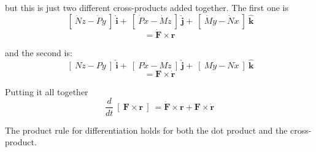 \documentclass[11pt, oneside]{article}
\begin{document}
but this is just two different cross-products added together.  The first one is
\[ \ [ \ \dot{N} z - \dot{P} y \ ] \ \mathbf{\hat{i}} + \  [ \ \dot{P} x - \dot{M} z \ ] \ \mathbf{\hat{j}} +  \ [ \ \dot{M} y - \dot{N} x \ ] \ \mathbf{\hat{k}} \]
\[ = \mathbf{\dot{F}} \times \mathbf{r} \]

and the second is:
\[ \ [ \  N \dot{z}  - P \dot{y} \ ] \ \mathbf{\hat{i}} + \  [ \ P \dot{x} - M \dot{z} \ ] \ \mathbf{\hat{j}} +  \ [ \ M \dot{y} - N \dot{x} \ ] \ \mathbf{\hat{k}} \]
\[ = \mathbf{F} \times \mathbf{\dot{r}} \]

Putting it all together
\[ \frac{d}{dt} \ [ \ \mathbf{F} \times \mathbf{r} \ ] \ = \mathbf{\dot{F}} \times \mathbf{r} + \mathbf{F} \times \mathbf{\dot{r}} \]

The product rule for differentiation holds for both the dot product and the cross-product.
\end{document}
